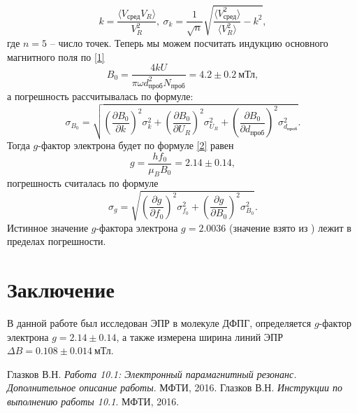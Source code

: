 \documentclass[a4paper,12pt]{article}
\begin{document}
\[k = \dfrac{\langle  V_{\text{сред}} V_R\rangle}{V_R^2},~\sigma_k = \dfrac{1}{\sqrt{n}}\sqrt{\dfrac{\langle V_{\text{сред}}^2 \rangle}{\langle V_R^2 \rangle} - k^2},\]
где $n = 5$ -- число точек. Теперь мы можем посчитать индукцию основного магнитного поля по \eqref{1}
\[B_0 = \dfrac{4k U}{\pi \omega d_{\text{проб}}^2 N_{\text{проб}}} = 4.2 \pm 0.2~\text{мТл},\]
а погрешность рассчитывалась по формуле:
\[\sigma_{B_0} = \sqrt{ \left( \dfrac{\partial B_0}{\partial k}\right)^2 \sigma_{k}^2 + \left( \dfrac{\partial B_0}{\partial U_R}\right)^2 \sigma_{U_R}^2 + \left( \dfrac{\partial B_0}{\partial d_{\text{проб}}}\right)^2 \sigma_{d_{\text{проб}}}^2}.\]
Тогда $g$-фактор электрона будет по формуле \eqref{2} равен
\[g = \dfrac{hf_0}{\mu_B B_0} = 2.14 \pm 0.14,\]
погрешность считалась по формуле
\[\sigma_g = \sqrt{ \left( \dfrac{\partial g}{\partial f_0}\right)^2 \sigma_{f_0}^2 + \left( \dfrac{\partial g}{\partial B_0}\right)^2 \sigma_{B_0}^2}.\]
Истинное значение $g$-фактора электрона $g = 2.0036$ (значение взято из \cite{laba1}) лежит в пределах погрешности.
\section*{Заключение}
В данной работе был исследован ЭПР в молекуле ДФПГ, определяется $g$-фактор электрона $g = 2.14 \pm 0.14$, а также измерена ширина линий ЭПР $\Delta B = 0.108 \pm 0.014~\text{мТл}$.
\begin{thebibliography}{9}
Глазков В.Н. 
\textit{Работа 10.1: Электронный парамагнитный резонанс.
Дополнительное описание работы}. 
МФТИ, 2016.
Глазков В.Н. 
\textit{Инструкции по выполнению работы 10.1}. 
МФТИ, 2016.
\end{thebibliography}
\end{document}
